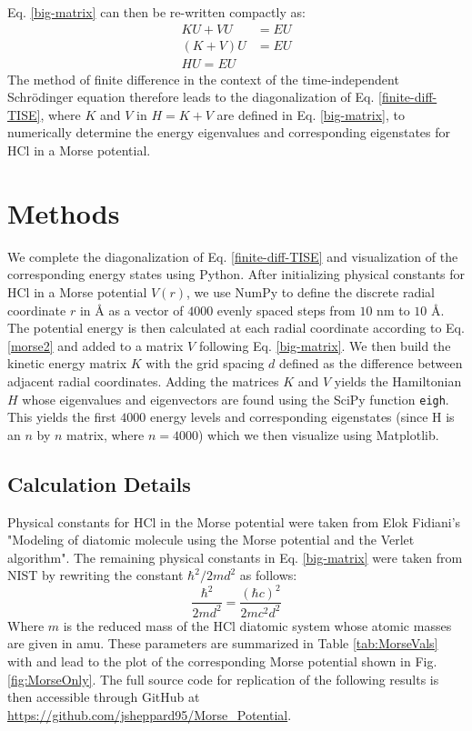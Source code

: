 \documentclass[%
aps, %
prl, %
preprint, %
12pt, %
amsfonts, %
amssymb, %
amsmath, %
endfloats,%
raggedbottom, %
]{revtex4-1}
\begin{document}
Eq. \ref{big-matrix} can then be re-written compactly as:
\begin{align}
    KU + VU &= EU \\
    (K + V)U &= EU \\ \label{finite-diff-TISE}
    HU = EU
\end{align}
The method of finite difference in the context of the time-independent Schrödinger equation
therefore leads to the diagonalization of Eq. \ref{finite-diff-TISE}, where $K$ and $V$ in
$H = K + V$ are defined in Eq. \ref{big-matrix}, to numerically determine the energy eigenvalues
and corresponding eigenstates for HCl in a Morse potential.

\section{\label{sec:Method}Methods}
We complete the diagonalization of Eq. \ref{finite-diff-TISE} and visualization of the
corresponding energy states using Python. After initializing physical constants for HCl in a 
Morse potential $V(r)$, we use NumPy to define the discrete radial coordinate $r$ in Å as a
vector of $4000$ evenly spaced steps from $10$ nm to $10$ Å. The potential energy is then
calculated at each radial coordinate according to Eq. \ref{morse2} and added to a matrix $V$
following Eq. \ref{big-matrix}. We then build the kinetic energy matrix $K$ with the grid spacing
$d$ defined as the difference between adjacent radial coordinates. Adding the matrices $K$ and
$V$ yields the Hamiltonian $H$ whose eigenvalues and eigenvectors are found using the SciPy
function \texttt{eigh}. This yields the first $4000$ energy levels and corresponding eigenstates
(since H is an $n$ by $n$ matrix, where $n = 4000$) which we then visualize using Matplotlib.


\subsection{\label{ssec:measdet}Calculation Details}
Physical constants for HCl in the Morse potential were taken from Elok Fidiani's "Modeling of 
diatomic molecule using the Morse potential and the Verlet algorithm". The remaining physical
constants in Eq. \ref{big-matrix} were taken from NIST by rewriting the constant $\hbar^2/2md^2$ as follows:
\begin{equation}
    \frac{\hbar^2}{2md^2} = \frac{(\hbar c)^2}{2mc^2d^2}
\end{equation}
Where $m$ is the reduced mass of the HCl diatomic system whose atomic masses are given in amu.
These parameters are summarized in Table \ref{tab:MorseVals} with and lead to the plot of the
corresponding Morse potential shown in Fig. \ref{fig:MorseOnly}. The full source code for
replication of the following results is then accessible through GitHub at
\href{https://github.com/jsheppard95/Morse_Potential}{https://github.com/jsheppard95/Morse\_Potential}.
\end{document}
